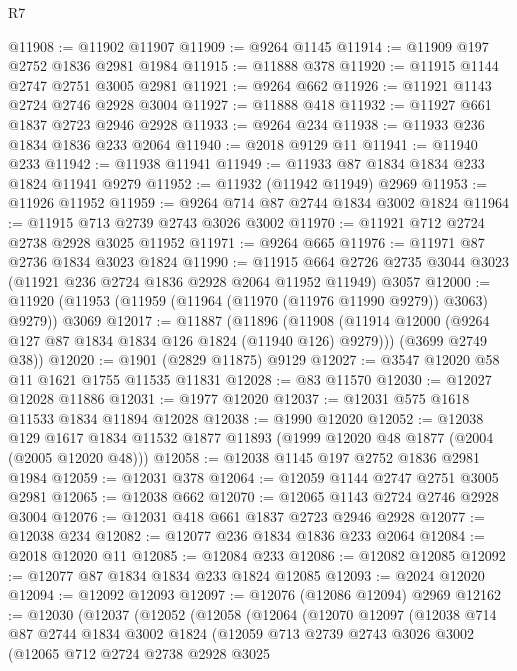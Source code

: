 \begin{lexlean}{R7}
\begin{coremodule}
@11908 := @11902 @11907
@11909 := @9264 @1145
@11914 := @11909 @197 @2752 @1836 @2981 @1984
@11915 := @11888 @378
@11920 := @11915 @1144 @2747 @2751 @3005 @2981
@11921 := @9264 @662
@11926 := @11921 @1143 @2724 @2746 @2928 @3004
@11927 := @11888 @418
@11932 := @11927 @661 @1837 @2723 @2946 @2928
@11933 := @9264 @234
@11938 := @11933 @236 @1834 @1836 @233 @2064
@11940 := @2018 @9129 @11
@11941 := @11940 @233
@11942 := @11938 @11941
@11949 := @11933 @87 @1834 @1834 @233 @1824 @11941 @9279
@11952 := @11932 (@11942 @11949) @2969
@11953 := @11926 @11952
@11959 := @9264 @714 @87 @2744 @1834 @3002 @1824
@11964 := @11915 @713 @2739 @2743 @3026 @3002
@11970 := @11921 @712 @2724 @2738 @2928 @3025 @11952
@11971 := @9264 @665
@11976 := @11971 @87 @2736 @1834 @3023 @1824
@11990 := @11915
    @664
    @2726
    @2735
    @3044
    @3023
    (@11921 @236 @2724 @1836 @2928 @2064 @11952 @11949)
    @3057
@12000 := @11920 (@11953 (@11959 (@11964 (@11970 (@11976 @11990 @9279)) @3063) @9279)) @3069
@12017 := @11887
    (@11896
      (@11908 (@11914 @12000 (@9264 @127 @87 @1834 @1834 @126 @1824 (@11940 @126) @9279)))
      (@3699 @2749 @38))
@12020 := @1901 (@2829 @11875) @9129
@12027 := @3547 @12020 @58 @11 @1621 @1755 @11535 @11831
@12028 := @83 @11570
@12030 := @12027 @12028 @11886
@12031 := @1977 @12020
@12037 := @12031 @575 @1618 @11533 @1834 @11894 @12028
@12038 := @1990 @12020
@12052 := @12038
    @129
    @1617
    @1834
    @11532
    @1877
    @11893
    (@1999 @12020 @48 @1877 (@2004 (@2005 @12020 @48)))
@12058 := @12038 @1145 @197 @2752 @1836 @2981 @1984
@12059 := @12031 @378
@12064 := @12059 @1144 @2747 @2751 @3005 @2981
@12065 := @12038 @662
@12070 := @12065 @1143 @2724 @2746 @2928 @3004
@12076 := @12031 @418 @661 @1837 @2723 @2946 @2928
@12077 := @12038 @234
@12082 := @12077 @236 @1834 @1836 @233 @2064
@12084 := @2018 @12020 @11
@12085 := @12084 @233
@12086 := @12082 @12085
@12092 := @12077 @87 @1834 @1834 @233 @1824 @12085
@12093 := @2024 @12020
@12094 := @12092 @12093
@12097 := @12076 (@12086 @12094) @2969
@12162 := @12030
    (@12037
      (@12052
        (@12058
          (@12064
            (@12070
              @12097
              (@12038
                @714
                @87
                @2744
                @1834
                @3002
                @1824
                (@12059
                  @713
                  @2739
                  @2743
                  @3026
                  @3002
                  (@12065
                    @712
                    @2724
                    @2738
                    @2928
                    @3025

\end{coremodule}
\end{lexlean}
